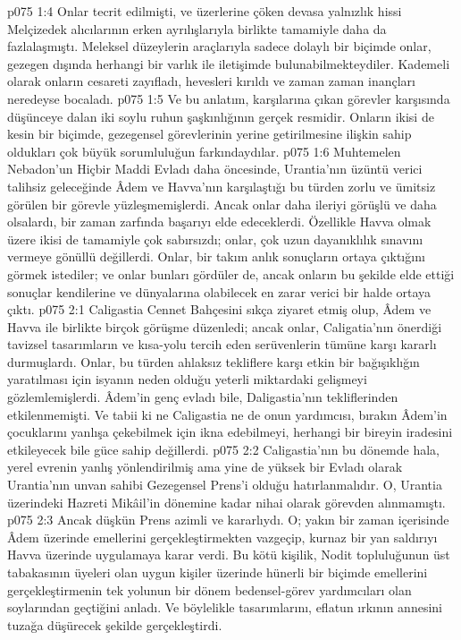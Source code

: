 \vs p075 1:4 Onlar tecrit edilmişti, ve üzerlerine çöken devasa yalnızlık hissi Melçizedek alıcılarının erken ayrılışlarıyla birlikte tamamiyle daha da fazlalaşmıştı. Meleksel düzeylerin araçlarıyla sadece dolaylı bir biçimde onlar, gezegen dışında herhangi bir varlık ile iletişimde bulunabilmekteydiler. Kademeli olarak onların cesareti zayıfladı, hevesleri kırıldı ve zaman zaman inançları neredeyse bocaladı.
\vs p075 1:5 Ve bu anlatım, karşılarına çıkan görevler karşısında düşünceye dalan iki soylu ruhun şaşkınlığının gerçek resmidir. Onların ikisi de kesin bir biçimde, gezegensel görevlerinin yerine getirilmesine ilişkin sahip oldukları çok büyük sorumluluğun farkındaydılar.
\vs p075 1:6 Muhtemelen Nebadon’un Hiçbir Maddi Evladı daha öncesinde, Urantia’nın üzüntü verici talihsiz geleceğinde Âdem ve Havva’nın karşılaştığı bu türden zorlu ve ümitsiz görülen bir görevle yüzleşmemişlerdi. Ancak onlar daha ileriyi görüşlü ve daha  olsalardı, bir zaman zarfında başarıyı elde edeceklerdi. Özellikle Havva olmak üzere ikisi de tamamiyle çok sabırsızdı; onlar, çok uzun dayanıklılık sınavını vermeye gönüllü değillerdi. Onlar, bir takım anlık sonuçların ortaya çıktığını görmek istediler; ve onlar bunları gördüler de, ancak onların bu şekilde elde ettiği sonuçlar kendilerine ve dünyalarına olabilecek en zarar verici bir halde ortaya çıktı.
\vs p075 2:1 Caligastia Cennet Bahçesini sıkça ziyaret etmiş olup, Âdem ve Havva ile birlikte birçok görüşme düzenledi; ancak onlar, Caligatia’nın önerdiği tavizsel tasarımların ve kısa\hyp{}yolu tercih eden serüvenlerin tümüne karşı kararlı durmuşlardı. Onlar, bu türden ahlaksız tekliflere karşı etkin bir bağışıklığın yaratılması için isyanın neden olduğu yeterli miktardaki gelişmeyi gözlemlemişlerdi. Âdem’in genç evladı bile, Daligastia’nın tekliflerinden etkilenmemişti. Ve tabii ki ne Caligastia ne de onun yardımcısı, bırakın Âdem’in çocuklarını yanlışa çekebilmek için ikna edebilmeyi, herhangi bir bireyin iradesini etkileyecek bile güce sahip değillerdi.
\vs p075 2:2 Caligastia’nın bu dönemde hala, yerel evrenin yanlış yönlendirilmiş ama yine de yüksek bir Evladı olarak Urantia’nın unvan sahibi Gezegensel Prens’i olduğu hatırlanmalıdır. O, Urantia üzerindeki Hazreti Mikâil’in dönemine kadar nihai olarak görevden alınmamıştı.
\vs p075 2:3 Ancak düşkün Prens azimli ve kararlıydı. O; yakın bir zaman içerisinde Âdem üzerinde emellerini gerçekleştirmekten vazgeçip, kurnaz bir yan saldırıyı Havva üzerinde uygulamaya karar verdi. Bu kötü kişilik, Nodit topluluğunun üst tabakasının üyeleri olan uygun kişiler üzerinde hünerli bir biçimde emellerini gerçekleştirmenin tek yolunun bir dönem bedensel\hyp{}görev yardımcıları olan soylarından geçtiğini anladı. Ve böylelikle tasarımlarını, eflatun ırkının annesini tuzağa düşürecek şekilde gerçekleştirdi.
